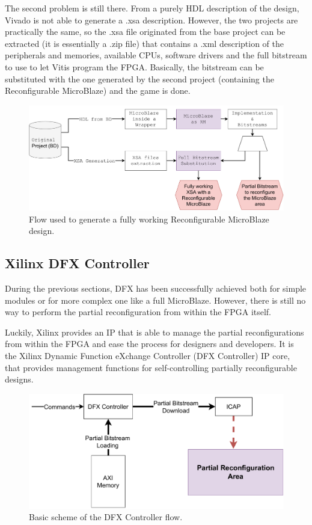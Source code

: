 The second problem is still there. From a purely HDL description of the design, Vivado is not able to generate a .xsa description. However, the two projects are practically the same, so the .xsa file originated from the base project can be extracted (it is essentially a .zip file) that contains a .xml description of the peripherals and memories, available CPUs, software drivers and the full bitstream to use to let Vitis program the FPGA. Basically, the bitstream can be substituted with the one generated by the second project (containing the Reconfigurable MicroBlaze) and the game is done.

\begin{figure}[H]
\centering
\includegraphics[width=1.0\linewidth]{images/chapter4/mystic_flow2.pdf}
\caption{Flow used to generate a fully working Reconfigurable MicroBlaze design.}
\label{fig:mystic_flow}
\end{figure}

\subsection{Xilinx DFX Controller}
During the previous sections, DFX has been successfully achieved both for simple modules or for more complex one like a full MicroBlaze. However, there is still no way to perform the partial reconfiguration from within the FPGA itself. \bigskip

Luckily, Xilinx provides an IP that is able to manage the partial reconfigurations from within the FPGA and ease the process for designers and developers. It is the Xilinx Dynamic Function eXchange Controller (DFX Controller) IP core, that provides management functions for self-controlling partially reconfigurable designs. \bigskip

\begin{figure}[H]
\centering
\includegraphics[width=0.9\linewidth]{images/chapter4/dfxc.pdf}
\caption{Basic scheme of the DFX Controller flow.}
\end{figure}

